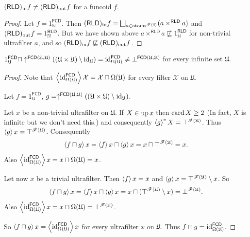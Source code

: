 \begin{example}
$(\mathsf{RLD})_{\mathrm{in}} f\ne(\mathsf{RLD})_{\mathrm{out}} f$ for a funcoid $f$.\end{example}
\begin{proof}
Let $f=1_{\mathbb{N}}^{\mathsf{FCD}}$. Then $\torldin f=\bigsqcup_{a\in\atoms^{\mathscr{F}(\mathbb{N})}}(a\times^{\mathsf{RLD}}a)$
and $(\mathsf{RLD})_{\mathrm{out}} f=1_{\mathbb{N}}^{\mathsf{RLD}}$. But we have shown
above $a\times^{\mathsf{RLD}}a\nsqsubseteq1_{\mathbb{N}}^{\mathsf{RLD}}$
for non-trivial ultrafilter $a$, and so $(\mathsf{RLD})_{\mathrm{in}} f\not\sqsubseteq(\mathsf{RLD})_{\mathrm{out}} f$.\end{proof}
\begin{prop}
\label{fcd-meet-frechet}$1_{\mathfrak{U}}^{\mathsf{FCD}}\sqcap\uparrow^{\mathsf{FCD}(\mathfrak{U},\mathfrak{U})}((\mathfrak{U}\times\mathfrak{U})\setminus{\operatorname{id}}_{\mathfrak{U}})={\operatorname{id}}_{\Omega(\mathfrak{U})}^{\mathsf{FCD}}\ne\bot^{\mathsf{FCD}(\mathfrak{U},\mathfrak{U})}$
for every infinite set $\mathfrak{U}$.\end{prop}
\begin{proof}
Note that $\left\langle {\operatorname{id}}_{\Omega(\mathfrak{U})}^{\mathsf{FCD}}\right\rangle\mathcal{X}=\mathcal{X}\sqcap\Omega(\mathfrak{U})$
for every filter $\mathcal{X}$ on $\mathfrak{U}$.

Let $f=1_{\mathfrak{U}}^{\mathsf{FCD}}$, $g=\uparrow^{\mathsf{FCD}(\mathfrak{U},\mathfrak{U})}((\mathfrak{U}\times\mathfrak{U})\setminus{\operatorname{id}}_{\mathfrak{U}})$.

Let $x$ be a non-trivial ultrafilter on $\mathfrak{U}$. If $X\in\operatorname{up} x$
then $\operatorname{card} X\ge2$ (In fact, $X$ is infinite but we don't need this.)
and consequently $\left\langle g\right\rangle ^{\ast}X=\top^{\mathscr{F}(\mathfrak{U})}$.
Thus $\left\langle g\right\rangle x=\top^{\mathscr{F}(\mathfrak{U})}$. Consequently
\[
\left\langle f\sqcap g\right\rangle x=\left\langle f\right\rangle x\sqcap\left\langle g\right\rangle x=x\sqcap\top^{\mathscr{F}(\mathfrak{U})}=x.
\]
Also $\left\langle {\operatorname{id}}_{\Omega(\mathfrak{U})}^{\mathsf{FCD}}\right\rangle x=x\sqcap\Omega(\mathfrak{U})=x$.

Let now $x$ be a trivial ultrafilter. Then $\left\langle f\right\rangle x=x$ and $\left\langle g\right\rangle x=\top^{\mathscr{F}(\mathfrak{U})}\setminus x$.
So
\[
\left\langle f\sqcap g\right\rangle x=\left\langle f\right\rangle x\sqcap\left\langle g\right\rangle x=x\sqcap(\top^{\mathscr{F}(\mathfrak{U})}\setminus x)=\bot^{\mathscr{F}(\mathfrak{U})}.
\]
Also $\left\langle {\operatorname{id}}_{\Omega(\mathfrak{U})}^{\mathsf{FCD}}\right\rangle x=x\sqcap\Omega(\mathfrak{U})=\bot^{\mathscr{F}(\mathfrak{U})}$.

So $\left\langle f\sqcap g\right\rangle x=\left\langle {\operatorname{id}}_{\Omega(\mathfrak{U})}^{\mathsf{FCD}}\right\rangle x$
for every ultrafilter $x$ on $\mathfrak{U}$. Thus $f\sqcap g={\operatorname{id}}_{\Omega(\mathfrak{U})}^{\mathsf{FCD}}$.\end{proof}
